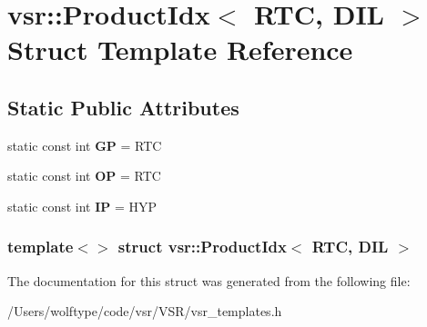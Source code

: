 \hypertarget{structvsr_1_1_product_idx_3_01_r_t_c_00_01_d_i_l_01_4}{\section{vsr\-:\-:Product\-Idx$<$ R\-T\-C, D\-I\-L $>$ Struct Template Reference}
\label{structvsr_1_1_product_idx_3_01_r_t_c_00_01_d_i_l_01_4}
}
\subsection*{Static Public Attributes}
\begin{DoxyCompactItemize}
\item 
\hypertarget{structvsr_1_1_product_idx_3_01_r_t_c_00_01_d_i_l_01_4_a45b7944f0dac954378b820cffcb5394b}{static const int {\bfseries G\-P} = R\-T\-C}\label{structvsr_1_1_product_idx_3_01_r_t_c_00_01_d_i_l_01_4_a45b7944f0dac954378b820cffcb5394b}

\item 
\hypertarget{structvsr_1_1_product_idx_3_01_r_t_c_00_01_d_i_l_01_4_a233a037a718a6831fc2b637ab46c9a7f}{static const int {\bfseries O\-P} = R\-T\-C}\label{structvsr_1_1_product_idx_3_01_r_t_c_00_01_d_i_l_01_4_a233a037a718a6831fc2b637ab46c9a7f}

\item 
\hypertarget{structvsr_1_1_product_idx_3_01_r_t_c_00_01_d_i_l_01_4_a325070cf6461cebdb6cd45cff7ace2aa}{static const int {\bfseries I\-P} = H\-Y\-P}\label{structvsr_1_1_product_idx_3_01_r_t_c_00_01_d_i_l_01_4_a325070cf6461cebdb6cd45cff7ace2aa}

\end{DoxyCompactItemize}
\subsubsection*{template$<$$>$ struct vsr\-::\-Product\-Idx$<$ R\-T\-C, D\-I\-L $>$}



The documentation for this struct was generated from the following file\-:\begin{DoxyCompactItemize}
\item 
/\-Users/wolftype/code/vsr/\-V\-S\-R/vsr\-\_\-templates.\-h\end{DoxyCompactItemize}
